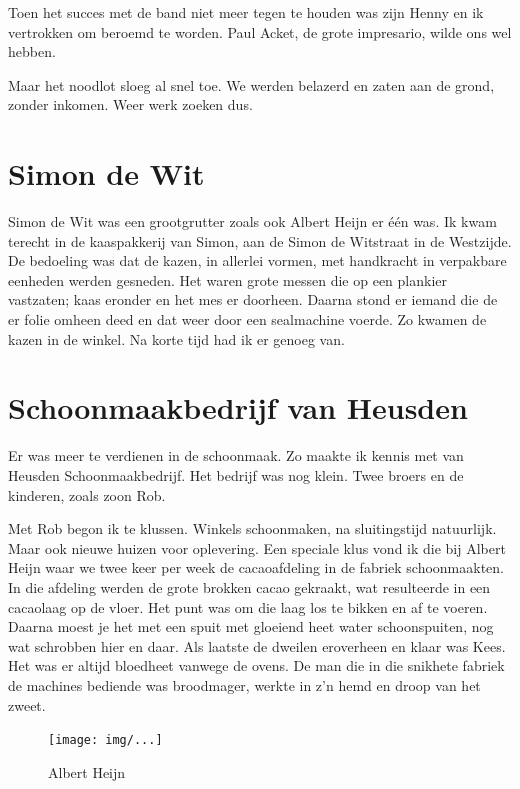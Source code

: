 \documentclass[12pt,twoside, openright]{memoir}
\begin{document}
Toen het succes met de band niet meer tegen te houden was zijn Henny en ik vertrokken om beroemd te worden. Paul Acket, de grote impresario, wilde ons wel hebben.

Maar het noodlot sloeg al snel toe. We werden belazerd en zaten aan de grond, zonder inkomen. Weer werk zoeken dus.

\chapter{Simon de Wit} %
\label{cha:wit}

Simon de Wit was een grootgrutter zoals ook Albert Heijn er één was. Ik kwam terecht in de kaaspakkerij van Simon, aan de Simon de Witstraat in de Westzijde. De bedoeling was dat de kazen, in allerlei vormen, met handkracht in verpakbare eenheden werden gesneden. Het waren grote messen die op een plankier vastzaten; kaas eronder en het mes er doorheen. Daarna stond er iemand die de er folie omheen deed en dat weer door een sealmachine voerde. Zo kwamen de kazen in de winkel. Na korte tijd had ik er genoeg van.

\chapter{Schoonmaakbedrijf van Heusden} %
\label{cha:schoonmaakbedrijf}

Er was meer te verdienen in de schoonmaak. Zo maakte ik kennis met van Heusden Schoonmaakbedrijf. Het bedrijf was nog klein. Twee broers en de kinderen, zoals zoon Rob. 

Met Rob begon ik te klussen. Winkels schoonmaken, na sluitingstijd natuurlijk. Maar ook nieuwe huizen voor oplevering. Een speciale klus vond ik die bij Albert Heijn waar we twee keer per week de cacaoafdeling in de fabriek schoonmaakten. In die afdeling werden de grote brokken cacao gekraakt, wat resulteerde in een cacaolaag op de vloer. Het punt was om die laag los te bikken en af te voeren. Daarna moest je het met een spuit met gloeiend heet water schoonspuiten, nog wat schrobben hier en daar. Als laatste de dweilen eroverheen en klaar was Kees. Het was er altijd bloedheet vanwege de ovens. De man die in die snikhete fabriek de machines bediende was broodmager, werkte in z’n hemd en droop van het zweet.

\begin{figure}[t]
\texttt{[image: img/...]}
\caption{Albert Heijn}
\end{figure}
\end{document}
